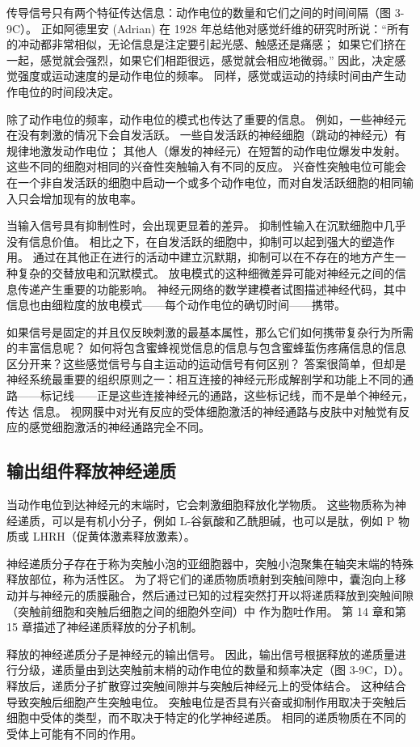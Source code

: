 传导信号只有两个特征传达信息：动作电位的数量和它们之间的时间间隔（图 3-9C）。 正如阿德里安 (Adrian) 在 1928 年总结他对感觉纤维的研究时所说：“所有的冲动都非常相似，无论信息是注定要引起光感、触感还是痛感； 如果它们挤在一起，感觉就会强烈，如果它们相距很远，感觉就会相应地微弱。” 因此，决定感觉强度或运动速度的是动作电位的频率。 同样，感觉或运动的持续时间由产生动作电位的时间段决定。

除了动作电位的频率，动作电位的模式也传达了重要的信息。 例如，一些神经元在没有刺激的情况下会自发活跃。 一些自发活跃的神经细胞（跳动的神经元）有规律地激发动作电位； 其他人（爆发的神经元）在短暂的动作电位爆发中发射。 这些不同的细胞对相同的兴奋性突触输入有不同的反应。 兴奋性突触电位可能会在一个非自发活跃的细胞中启动一个或多个动作电位，而对自发活跃细胞的相同输入只会增加现有的放电率。

当输入信号具有抑制性时，会出现更显着的差异。 抑制性输入在沉默细胞中几乎没有信息价值。 相比之下，在自发活跃的细胞中，抑制可以起到强大的塑造作用。 通过在其他正在进行的活动中建立沉默期，抑制可以在不存在的地方产生一种复杂的交替放电和沉默模式。 放电模式的这种细微差异可能对神经元之间的信息传递产生重要的功能影响。 神经元网络的数学建模者试图描述神经代码，其中信息也由细粒度的放电模式——每个动作电位的确切时间——携带。

如果信号是固定的并且仅反映刺激的最基本属性，那么它们如何携带复杂行为所需的丰富信息呢？ 如何将包含蜜蜂视觉信息的信息与包含蜜蜂蜇伤疼痛信息的信息区分开来？这些感觉信号与自主运动的运动信号有何区别？ 答案很简单，但却是神经系统最重要的组织原则之一：相互连接的神经元形成解剖学和功能上不同的通路——标记线——正是这些连接神经元的通路，这些标记线，而不是单个神经元，传达 信息。 视网膜中对光有反应的受体细胞激活的神经通路与皮肤中对触觉有反应的感觉细胞激活的神经通路完全不同。

\subsection{输出组件释放神经递质}
当动作电位到达神经元的末端时，它会刺激细胞释放化学物质。 这些物质称为神经递质，可以是有机小分子，例如 L-谷氨酸和乙酰胆碱，也可以是肽，例如 P 物质或 LHRH（促黄体激素释放激素）。

神经递质分子存在于称为突触小泡的亚细胞器中，突触小泡聚集在轴突末端的特殊释放部位，称为活性区。 为了将它们的递质物质喷射到突触间隙中，囊泡向上移动并与神经元的质膜融合，然后通过已知的过程突然打开以将递质释放到突触间隙（突触前细胞和突触后细胞之间的细胞外空间）中 作为胞吐作用。 第 14 章和第 15 章描述了神经递质释放的分子机制。

释放的神经递质分子是神经元的输出信号。 因此，输出信号根据释放的递质量进行分级，递质量由到达突触前末梢的动作电位的数量和频率决定（图 3-9C，D）。 释放后，递质分子扩散穿过突触间隙并与突触后神经元上的受体结合。 这种结合导致突触后细胞产生突触电位。 突触电位是否具有兴奋或抑制作用取决于突触后细胞中受体的类型，而不取决于特定的化学神经递质。 相同的递质物质在不同的受体上可能有不同的作用。

